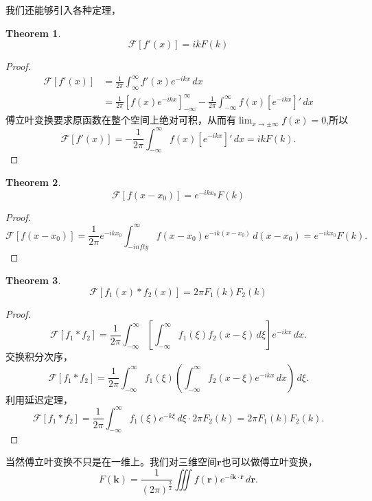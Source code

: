 \documentclass[12pt,a4paper,openany,twoside]{book}
\newtheorem{theorem}{Theorem}[section]
\numberwithin{equation}{section}
\begin{document}
我们还能够引入各种定理，
\begin{theorem}
\begin{equation}
  \mathcal{F}[f'(x)] = ik F(k)
  \end{equation}
\end{theorem}
\begin{proof}
\begin{align*}
  \mathcal{F}[f'(x)] &=\frac{1}{2\pi}\int ^\infty_\infty f'(x) e^{-ik x} \, dx \\
         &= \frac{1}{2\pi}\left[ f(x) e^{-ik x} \right] ^\infty _{-\infty} - \frac{1}{2\pi}\int ^\infty _{-\infty} f(x) \left[ e^{-ik x} \right] ' \, dx 
\end{align*}
傅立叶变换要求原函数在整个空间上绝对可积，从而有$\lim_{x\to \pm \infty} f(x) = 0$,所以
\[
  \mathcal{F}[f'(x)] = - \frac{1}{2\pi}\int ^\infty_{-\infty} f(x) \left[ e^{-ik x} \right] '  \, dx = ik F(k) 
.\] 
\end{proof}
\begin{theorem}
\begin{equation}
  \mathcal{F}[f(x-x_0)] = e^{-ikx_0} F(k)
\end{equation}
\end{theorem}
\begin{proof}
  \[
    \mathcal{F}[f(x-x_0)] =\frac{1}{2\pi} e^{-ikx_0}\int ^\infty_{-infty} f(x-x_0) e^{-ik(x-x_0)} \, d(x-x_0) = e^{-ikx_0} F(k)
  .\] 
\end{proof}
\begin{theorem}
  \begin{equation}
    \mathcal{F}[f_1(x) * f_2(x)] = 2\pi F_1(k)F_2(k)
  \end{equation}
\end{theorem}
\begin{proof}
  \[
    \mathcal{F}[f_1*f_2] = \frac{1}{2\pi}\int ^\infty_{-\infty} \left[ \int ^\infty_{-\infty} f_1(\xi) f_2(x-\xi) \, d\xi   \right] e^{-ikx} \, dx 
  .\] 
  交换积分次序，
  \[
    \mathcal{F}[f_1*f_2] = \frac{1}{2\pi} \int ^\infty _{-\infty} f_1(\xi) \left( \int ^\infty_{-\infty} f_2(x-\xi) e^{-ik x} \, dx  \right) \, d\xi 
  .\] 
  利用延迟定理，
  \[
    \mathcal{F}[f_1 * f_2] = \frac{1}{2\pi} \int ^\infty_{-\infty} f_1(\xi) e^{-k\xi} \, d\xi \cdot 2\pi F_2(k) = 2\pi F_1(k)F_2(k)
  .\] 
\end{proof}

当然傅立叶变换不只是在一维上。我们对三维空间$\mathbf{r}$也可以做傅立叶变换，
\[
  F(\mathbf{k}) = \frac{1}{(2\pi)^{\frac{3}{2}}} \iiint f(\mathbf{r})  e^{-i\mathbf{k}\cdot\mathbf{r}  } \, d\mathbf{r} 
.\] 
\end{document}
